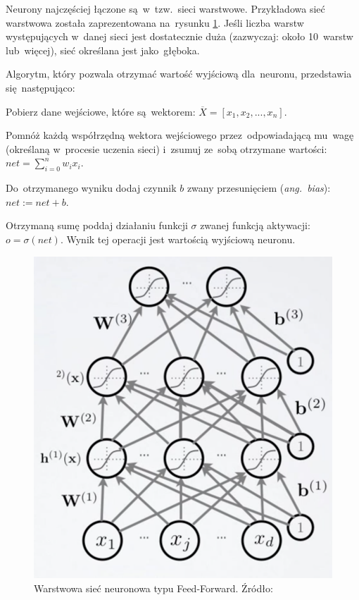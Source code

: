 \documentclass[oneside, 11pt, a4paper]{article}
\begin{document}
\begin{multicols}{2}
Neurony najczęściej łączone są~w~tzw.~sieci warstwowe. Przykładowa sieć warstwowa została zaprezentowana na~rysunku \ref{fig:feed-forward-net}. Jeśli liczba warstw występujących w~danej sieci jest dostatecznie duża (zazwyczaj: około 10~warstw lub~więcej), sieć określana jest jako~głęboka.

Algorytm, który pozwala otrzymać wartość wyjściową dla~neuronu, przedstawia się~następująco:
\begin{compactenum}
	\item Pobierz dane wejściowe, które są~wektorem: $\overline{X}=[x_1, x_2, ..., x_n]$.
	\item Pomnóż każdą współrzędną wektora wejściowego przez~odpowiadającą mu~wagę (określaną w~procesie uczenia sieci) i~zsumuj ze~sobą otrzymane wartości: $net = \sum\limits_{i=0}^{n} w_i x_i$.
	\item Do~otrzymanego wyniku dodaj czynnik $b$ zwany przesunięciem (\textit{ang.~bias}): $net := net + b$.
	\item Otrzymaną sumę poddaj działaniu funkcji $\sigma$ zwanej funkcją aktywacji: \mbox{$o=\sigma(net)$}. Wynik tej operacji jest wartością wyjściową neuronu.
\end{compactenum}
\begin{figure}[H]
	\centering
	\includegraphics[width=\linewidth]{img/feed_forward_neural_network.png}
	\vspace{-8mm}
	\caption{Warstwowa sieć neuronowa typu Feed-Forward. Źródło: \cite{feed-forward-net-source}}
	\label{fig:feed-forward-net}
\end{figure}
\vspace{-5mm}

\end{multicols}
\end{document}
